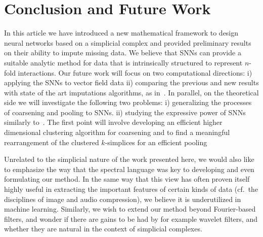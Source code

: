 \section{Conclusion and Future Work}

In this article we have introduced a new mathematical framework to design neural networks based on a simplicial complex and provided preliminary results on their ability to impute missing data. We believe that SNNs can provide a suitable analytic method for data that is intrinsically structured to represent $n$-fold interactions.
Our future work will focus on two computational directions:  i) applying the SNNs to vector field data ii) comparing the previous and new results with state of the art imputations algorithms, as in~\cite{spinelli2020neural}. 
In parallel, on the theoretical side we will investigate the following two problems: i) generalizing the processes of coarsening and pooling to SNNs. ii) studying the expressive power of SNNs similarly to~\cite{morris2019weisfeiler}. The first point will involve developing an efficient higher dimensional clustering algorithm for coarsening and to find a meaningful rearrangement of the clustered $k$-simplices for an efficient pooling

Unrelated to the simplicial nature of the work presented here, we would also like to emphasize the way that the spectral language was key to developing and even formulating our method. In the same way that this view has often proven itself highly useful in extracting the important features of certain kinds of data (cf.\ the disciplines of image and audio compression), we believe it is underutilized in machine learning. Similarly, we wish to extend our method beyond Fourier-based filters, and wonder if there are gains to be had by for example wavelet filters, and whether they are natural in the context of simplicial complexes.


